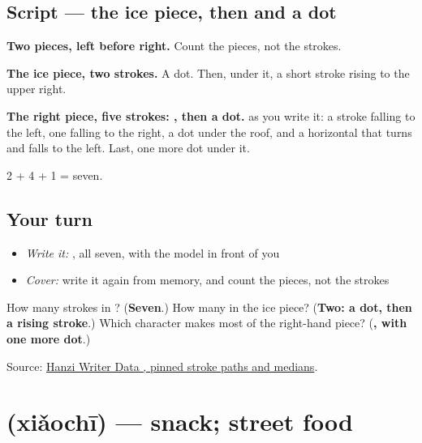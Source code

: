 \subsection*{Script — the ice piece, then  and a dot}

\begin{quote}
\end{quote}

\textbf{Two pieces, left before right.} Count the pieces, not the strokes.

\textbf{The ice piece, two strokes.} A dot. Then, under it, a short stroke rising to the upper right.

\textbf{The right piece, five strokes: , then a dot.}  as you write it: a stroke falling to the left, one falling to the right, a dot under the roof, and a horizontal that turns and falls to the left. Last, one more dot under it.

2 + 4 + 1 = seven.

\subsection*{Your turn}
\begin{itemize}
\raggedright
  \item \emph{Write it:} , all seven, with the model in front of you
  \item \emph{Cover:} write it again from memory, and count the pieces, not the strokes
\end{itemize}

\begin{tcolorbox}[breakable,colback=teal!4,colframe=teal!35!black,title={Before you move on}]
How many strokes in ? (\textbf{Seven}.) How many in the ice piece? (\textbf{Two: a dot, then a rising stroke}.) Which character makes most of the right-hand piece? (\textbf{, with one more dot}.)

Source: \href{https://raw.githubusercontent.com/chanind/hanzi-writer-data/68d10a4b21150cae5e1ebbd223eed289cf32d90c/data/\%E5\%86\%B7.json}{Hanzi Writer Data , pinned stroke paths and medians}.
\end{tcolorbox}
\section[\texorpdfstring{\zh{小吃} (xiǎochī)}{小吃 (xiǎochī)}]{ (xiǎochī) — snack; street food}

